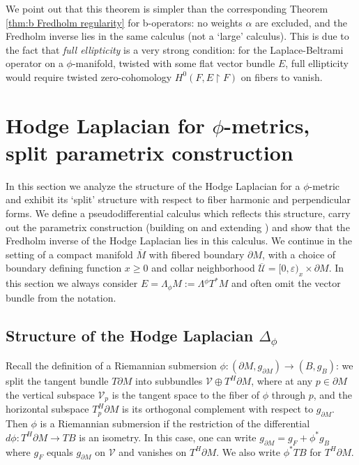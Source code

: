 \documentclass[JEP,XML,SOM,Unicode,NoFloatCountersInSection,published]{cedram}
\theoremstyle{plain}
\theoremstyle{definition}
\newcommand{\Umath}{{\mathscr{U}}}
\newcommand\calV{{\mathcal V}}
\newcommand{\dM}{{\partial M}}
\newcommand{\Mbar}{{\overline{M}}}\let\M\Mbar
\let\eps\varepsilon
\begin{document}
We point out that this theorem is simpler than the corresponding Theorem \ref{thm:b Fredholm regularity} for b-operators: no weights $\alpha$ are excluded, and the Fredholm inverse lies in the same calculus (not a `large' calculus).
This is due to the fact that \emph{full ellipticity} is a very strong condition: \eg for the Laplace-Beltrami operator on a $\phi$-manifold, twisted with some flat vector bundle $E$, full ellipticity would require
twisted zero-cohomology $H^0(F,E\restriction F)$ on fibers to vanish.

\section{Hodge Laplacian for \texorpdfstring{$\phi$}{phi}-metrics, split parametrix construction}\label{sec:split}
In this section we analyze the structure of the Hodge Laplacian for a $\phi$-metric and exhibit its `split' structure with respect to fiber harmonic and perpendicular forms.
We define a pseudodifferential calculus which reflects this structure, carry out the parametrix construction (building on and extending \cite{grieser-para}) and show that the Fredholm inverse of the Hodge Laplacian lies in this calculus. We continue in the setting
of a compact manifold $\Mbar$ with fibered boundary $\partial M$, with a choice of boundary defining function $x \geq 0$ and collar neighborhood $\overline{\Umath}=[0,\eps)_x\times\dM$. In this section we always consider
$E= \Lambda_\phi M:=\Lambda {}^\phi T^*M$ and often omit the vector bundle from the notation.

\subsection{Structure of the Hodge Laplacian \texorpdfstring{$\Delta_{\phi}$}{Delta}}\label{subsec:str hodge}
Recall the definition of a Riemannian submersion $\phi: (\partial M, g_\dM)
\to (B, g_B)$: we split the tangent bundle $T\partial M$
into subbundles $\calV\oplus T^H \partial M$, where at any $p\in \partial M$
the vertical subspace $\calV_p$ is the tangent
space to the fiber of $\phi$ through $p$, and the horizontal subspace $T^H_p \partial M$ is its orthogonal complement with respect to $g_\dM$.
Then $\phi$ is a Riemannian submersion if the restriction of the differential $d\phi:T^H\dM \to TB$ is an isometry. In this case, one can write $g_\dM=g_F + \phi^*g_B$ where $g_{F}$ equals $g_{\dM}$ on $\calV$ and vanishes on $T^H \partial M$.
We also write $\phi^*TB$ for $T^H \partial M$.
\end{document}
